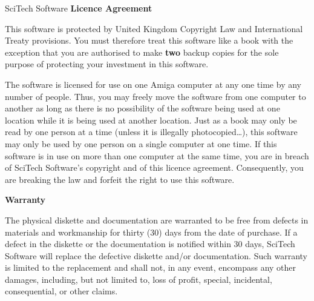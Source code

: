
\newcommand{\amplot}{{\bf AMPlot2}}
\newcommand{\RA}[1]{\mbox{{\em Right-Amiga}--{\bf #1}}}
\newcommand{\degree}{\mbox{$\mbox{}^\circ$}}


\makeindex


\begin{center}
\Large\sf SciTech Software \bf Licence Agreement
\end{center}
\vspace*{1ex}
This software is protected by United Kingdom Copyright
Law and International 
Treaty provisions. You must therefore treat this software like a book with the 
exception that you are authorised to make {\bf two} backup
copies for the sole purpose of protecting your investment in this software.

The software is licensed for use on one Amiga computer at any one time by any
number of people. Thus, you 
may freely move the software from one computer to another as long as there is no 
possibility of the software being used at one location while it is being used at 
another location. Just as a book may only be read by one person at a time (unless 
it is illegally photocopied\ldots), this software may only be used by one person 
on a single computer at one time. If this software is in use on more than one 
computer at the same time, you are in breach of {\sf SciTech Software's} 
copyright and of this licence agreement. Consequently, you are breaking the law 
and forfeit the right to use this software.

\vspace*{1em}
\begin{center}
\Large\bf Warranty
\end{center}
\vspace*{1ex}
The physical diskette and documentation are warranted to be free 
from defects in 
materials and workmanship for thirty (30) days from the date of purchase. If a 
defect in the diskette or the documentation is notified within 30 days, {\sf 
SciTech Software} will replace the defective diskette and/or documentation. Such 
warranty is limited to the replacement and shall not, in any event,
encompass any other damages, 
including, but not limited to, loss of profit, special, incidental, consequential, 
or other claims.

